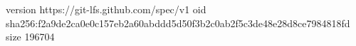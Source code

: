version https://git-lfs.github.com/spec/v1
oid sha256:f2a9de2ca0e0c157eb2a60abddd5d50f3b2c0ab2f5c3de48e28d8ce7984818fd
size 196704
